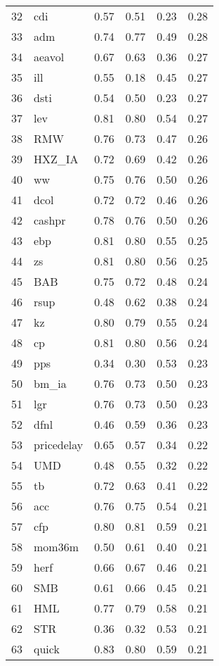 \documentclass[12pt]{article}
\begin{document}
\begin{footnotesize}
\begin{longtable}{rl|c|c|c|c}
  32 & cdi & 0.57 & 0.51 & 0.23 & 0.28 \\ 
  33 & adm & 0.74 & 0.77 & 0.49 & 0.28 \\ 
  34 & aeavol & 0.67 & 0.63 & 0.36 & 0.27 \\ 
  35 & ill & 0.55 & 0.18 & 0.45 & 0.27 \\ 
  36 & dsti & 0.54 & 0.50 & 0.23 & 0.27 \\ 
  37 & lev & 0.81 & 0.80 & 0.54 & 0.27 \\ 
  38 & RMW & 0.76 & 0.73 & 0.47 & 0.26 \\ 
  39 & HXZ\_IA & 0.72 & 0.69 & 0.42 & 0.26 \\ 
  40 & ww & 0.75 & 0.76 & 0.50 & 0.26 \\ 
  41 & dcol & 0.72 & 0.72 & 0.46 & 0.26 \\ 
  42 & cashpr & 0.78 & 0.76 & 0.50 & 0.26 \\ 
  43 & ebp & 0.81 & 0.80 & 0.55 & 0.25 \\ 
  44 & zs & 0.81 & 0.80 & 0.56 & 0.25 \\ 
  45 & BAB & 0.75 & 0.72 & 0.48 & 0.24 \\ 
  46 & rsup & 0.48 & 0.62 & 0.38 & 0.24 \\ 
  47 & kz & 0.80 & 0.79 & 0.55 & 0.24 \\ 
  48 & cp & 0.81 & 0.80 & 0.56 & 0.24 \\ 
  49 & pps & 0.34 & 0.30 & 0.53 & 0.23 \\ 
  50 & bm\_ia & 0.76 & 0.73 & 0.50 & 0.23 \\ 
  51 & lgr & 0.76 & 0.73 & 0.50 & 0.23 \\ 
  52 & dfnl & 0.46 & 0.59 & 0.36 & 0.23 \\ 
  53 & pricedelay & 0.65 & 0.57 & 0.34 & 0.22 \\ 
  54 & UMD & 0.48 & 0.55 & 0.32 & 0.22 \\ 
  55 & tb & 0.72 & 0.63 & 0.41 & 0.22 \\ 
  56 & acc & 0.76 & 0.75 & 0.54 & 0.21 \\ 
  57 & cfp & 0.80 & 0.81 & 0.59 & 0.21 \\ 
  58 & mom36m & 0.50 & 0.61 & 0.40 & 0.21 \\ 
  59 & herf & 0.66 & 0.67 & 0.46 & 0.21 \\ 
  60 & SMB & 0.61 & 0.66 & 0.45 & 0.21 \\ 
  61 & HML & 0.77 & 0.79 & 0.58 & 0.21 \\ 
  62 & STR & 0.36 & 0.32 & 0.53 & 0.21 \\ 
  63 & quick & 0.83 & 0.80 & 0.59 & 0.21 \\ 

\end{longtable}
\end{footnotesize}
\end{document}
